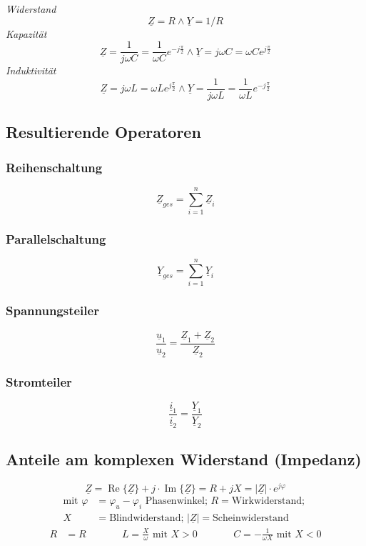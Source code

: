 \emph{Widerstand}
\[\underline{Z} = R \wedge \underline{Y} = 1/R\]
\emph{Kapazität}
\[\underline{Z} = \frac{1}{j \omega C} = \frac{1}{\omega C} e^{-j \frac{\pi}{2}} \wedge \underline{Y} = j \omega C = \omega C e^{j \frac{\pi}{2}}\]
\emph{Induktivität}
\[\underline{Z} = j \omega L = \omega L e^{j \frac{\pi}{2}} \wedge \underline{Y} = \frac{1}{j \omega L} = \frac{1}{\omega L} e^{-j \frac{\pi}{2}}\]

\newpage
\subsection*{Resultierende Operatoren}

\begin{multicols}{2}{}
\subsubsection*{Reihenschaltung}
\[\underline{Z}_{ges} = \sum \limits_{i=1}^{n} \underline{Z}_i\]
\subsubsection*{Parallelschaltung}
\[\underline{Y}_{ges} = \sum \limits_{i=1}^{n} \underline{Y}_i\]
\end{multicols}

\begin{multicols}{2}{}
\subsubsection*{Spannungsteiler}
\[\frac{\underline{u}_1}{\underline{u}_2} = \frac{\underline{Z}_1 + \underline{Z}_2}{\underline{Z}_2}\]
\subsubsection*{Stromteiler}
\[\frac{\underline{i}_1}{\underline{i}_2} = \frac{\underline{Y}_1}{\underline{Y}_2}\]
\end{multicols}

\subsection*{Anteile am komplexen Widerstand (Impedanz)}
\[\underline{Z} = \operatorname{Re}\{\underline{Z}\} + j \cdot \operatorname{Im}\{\underline{Z}\} = R + jX = \left|\underline{Z}\right| \cdot e^{j\varphi}\]
\begin{align*}
\text{mit }\varphi &= \varphi_u - \varphi_i \text{ Phasenwinkel; } R = \text{Wirkwiderstand; } \\ X &= \text{Blindwiderstand; } \left|\underline{Z}\right| = \text{Scheinwiderstand }
\end{align*}
\begin{alignat*}{3}
R&=R &\quad\quad& L=\frac{X}{\omega} \text{ mit } X>0 &\quad\quad& C=-\frac{1}{\omega X} \text{ mit } X<0
\end{alignat*}

